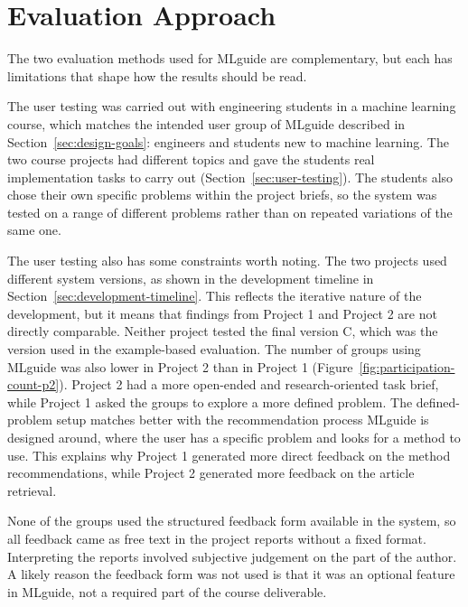 \section{Evaluation Approach}
\label{sec:evaluation-approach}

The two evaluation methods used for MLguide are complementary, 
but each has limitations that shape how the results should be 
read.

The user testing was carried out with engineering students 
in a machine learning course, which matches the intended 
user group of MLguide described in 
Section~\ref{sec:design-goals}: engineers and students new 
to machine learning. The two course projects had different 
topics and gave the students real implementation tasks to 
carry out (Section~\ref{sec:user-testing}). The students 
also chose their own specific problems within the project 
briefs, so the system was tested on a range of different 
problems rather than on repeated variations of the same one.

The user testing also has some constraints worth noting. 
The two projects used different system versions, 
as shown in the development timeline in 
Section~\ref{sec:development-timeline}. This reflects the 
iterative nature of the development, but it means that 
findings from Project 1 and Project 2 are not directly 
comparable. Neither project tested the final version C, which 
was the version used in the example-based evaluation. 
The number of groups using MLguide was also lower in Project 
2 than in Project 1 (Figure~\ref{fig:participation-count-p2}). 
Project 2 had a more open-ended and research-oriented 
task brief, while Project 1 
asked the groups to explore a more defined problem. The 
defined-problem setup matches better with the recommendation 
process MLguide is designed around, where the user has a 
specific problem and looks for a method to use. This explains 
why Project 1 generated more direct feedback on the method 
recommendations, while Project 2 generated more feedback on 
the article retrieval.

None of the groups used the structured feedback 
form available in the system, so all feedback came as free text in the 
project reports without a fixed format. Interpreting the 
reports involved subjective judgement on the part of the 
author. A likely reason the feedback form was not used is 
that it was an optional feature in MLguide, not a required 
part of the course deliverable.

